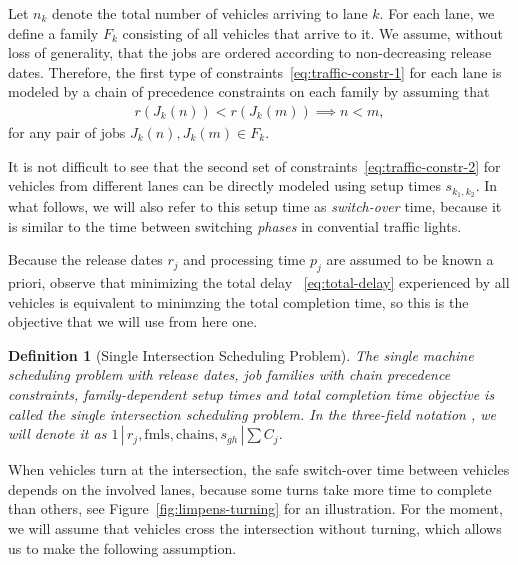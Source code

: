 \documentclass{article}
\theoremstyle{definition}
\theoremstyle{plain}
\newtheorem{define}{Definition}[section]
\begin{document}
Let $n_{k}$ denote the total number of vehicles arriving to lane $k$. For each
lane, we define a family $F_{k}$ consisting of all vehicles that arrive to it.
We assume, without loss of generality, that the jobs are ordered according to
non-decreasing release dates. Therefore, the first type of
constraints~\eqref{eq:traffic-constr-1} for each lane is modeled by a chain
of precedence constraints on each family by assuming that
\begin{align*}
  r(J_{k}(n)) < r(J_{k}(m)) \implies n < m ,
\end{align*}
for any pair of jobs $J_{k}(n), J_{k}(m) \in F_{k}$.

It is not difficult to see
that the second set of constraints~\eqref{eq:traffic-constr-2} for vehicles from
different lanes can be directly modeled using setup times $s_{k_{1},k_{2}}$. In
what follows, we will also refer to this setup time as \textit{switch-over}
time, because it is similar to the time between switching \textit{phases} in
convential traffic lights.

Because the release dates $r_{j}$ and processing time $p_{j}$ are assumed to be
known a priori, observe that minimizing the total delay ~\eqref{eq:total-delay}
experienced by all vehicles is equivalent to minimzing the total completion time,
so this is the objective that we will use from here one.

\begin{define}[Single Intersection Scheduling Problem]
  \label{def:single-problem}
  The single machine scheduling problem with release dates, job families with
  chain precedence constraints, family-dependent setup times and total
  completion time objective is called the {\normalfont single intersection
    scheduling problem}. In the three-field notation
  \cite{grahamOptimizationApproximationDeterministic1979}, we will denote it as
  $1 \, | \, r_{j}, \text{fmls}, \text{chains}, s_{gh} \, | \sum C_{j}$.
\end{define}

When vehicles turn at the intersection, the safe switch-over time between
vehicles depends on the involved lanes, because some turns take more time to
complete than others, see Figure~\ref{fig:limpens-turning} for an illustration.
For the moment, we will assume that vehicles cross the intersection without
turning, which allows us to make the following assumption.
\end{document}
